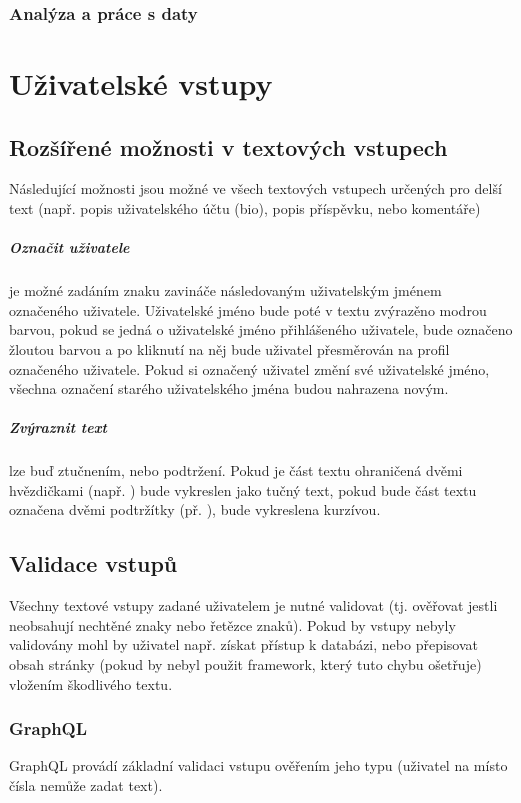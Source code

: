 \documentclass[12pt, a4paper,
 twoside,        %
 openright
]{report}
\begin{document}
        \subsection{Analýza a práce s daty}


\chapter{Uživatelské vstupy}
\section{Rozšířené možnosti v textových vstupech}
Následující možnosti jsou možné ve všech textových vstupech určených pro delší text (např. popis uživatelského účtu (bio), popis příspěvku, nebo komentáře)
\paragraph{Označit uživatele} je možné zadáním znaku zavináče následovaným uživatelským jménem označeného uživatele. Uživatelské jméno bude poté v textu zvýrazěno modrou barvou, pokud se jedná o uživatelské jméno přihlášeného uživatele, bude označeno žloutou barvou a po kliknutí na něj bude uživatel přesměrován na profil označeného uživatele. Pokud si označený uživatel změní své uživatelské jméno, všechna označení starého uživatelského jména budou nahrazena novým.
\paragraph{Zvýraznit text} lze buď ztučnením, nebo podtržení. Pokud je část textu ohraničená dvěmi hvězdičkami (např. ) bude vykreslen jako tučný text, pokud bude část textu označena dvěmi podtržítky (př. ), bude vykreslena kurzívou.

\section{Validace vstupů}
Všechny textové vstupy zadané uživatelem je nutné validovat (tj. ověřovat jestli neobsahují nechtěné znaky nebo řetězce znaků). Pokud by vstupy nebyly validovány mohl by uživatel např. získat přístup k databázi, nebo přepisovat obsah stránky (pokud by nebyl použit framework, který tuto chybu ošetřuje) vložením škodlivého textu.
\subsection{GraphQL}
GraphQL provádí základní validaci vstupu ověřením jeho typu (uživatel na místo čísla nemůže zadat text). 
\end{document}
